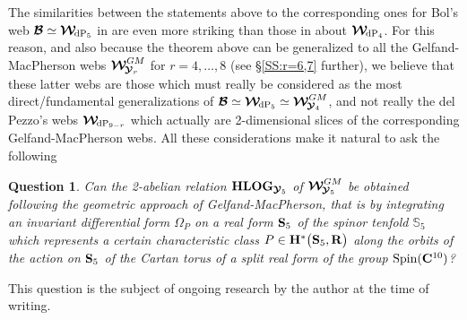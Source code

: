 \documentclass[11pt]{amsart}
\newcommand{\sk}{\smallskip}
\newtheorem{question}[thm]{Question}
\begin{document}
The similarities between the statements above to the corresponding ones  for Bol's web $\boldsymbol{\mathcal B}\simeq \boldsymbol{\mathcal W}_{  \hspace{-0.05cm} {\rm dP}_5}$ in \cite[\S1.1]{PirioAFST}
are even more striking than those  in \cite[\S1.2]{PirioAFST} about $\boldsymbol{\mathcal W}_{  \hspace{-0.05cm} {\rm dP}_4}$.  For this reason, and also because the theorem above can be generalized to all the Gelfand-MacPherson webs 
$ \boldsymbol{\mathcal W}^{GM}_{ \hspace{-0.05cm}
\boldsymbol{\mathcal Y}_r}$ for $r=4,\ldots,8$ (see 
 \S\ref{SS:r=6,7} further), 
we believe that these latter webs are those which must really be considered as the most direct/fundamental generalizations of $\boldsymbol{\mathcal B}\simeq
\boldsymbol{\mathcal W}_{  \hspace{-0.05cm} {\rm dP}_5}\simeq 
 \boldsymbol{\mathcal W}^{GM}_{ \hspace{-0.05cm}
\boldsymbol{\mathcal Y}_4}$, and not really the del Pezzo's webs $\boldsymbol{\mathcal W}_{  \hspace{-0.05cm} {\rm dP}_{9-r}}$ which actually are 2-dimensional slices of the corresponding Gelfand-MacPherson webs.  All these considerations 
make it natural to ask the following 
\begin{question}
\label{Question:DilogAR-a-la-GM}
Can the 2-abelian relation ${\bf HLOG}_{ \boldsymbol{\mathcal Y}_5 }$ 
of %
 $ \boldsymbol{\mathcal W}^{GM}_{ \hspace{-0.05cm}
\boldsymbol{\mathcal Y}_5}$
be obtained following the geometric approach of  Gelfand-MacPherson,  that is 
by integrating an invariant differential form $\Omega_P$ on a real form ${\bf S}_5$ of the spinor tenfold $\mathbb S_5$ which represents a certain characteristic class $P\in 
{\bf H}^*\big( {\bf S}_5,\mathbf R\big)$ along the orbits of the action on ${\bf S}_5$ of the Cartan torus 
of a split real form of 
 the %
  group 
 ${\rm Spin}(\mathbf C^{10})$?  
\end{question}

This question is the subject of ongoing research by the author at the time of writing.
\sk 
\end{document}
